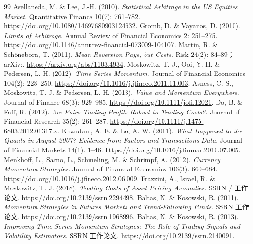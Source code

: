 \begin{thebibliography}{99}
 Avellaneda, M. \& Lee, J.-H. (2010). \emph{Statistical Arbitrage in the US Equities Market}. Quantitative Finance 10(7): 761--782. \href{https://doi.org/10.1080/14697680903124632}{https://doi.org/10.1080/14697680903124632}.
 Gromb, D. \& Vayanos, D. (2010). \emph{Limits of Arbitrage}. Annual Review of Financial Economics 2: 251--275. \href{https://doi.org/10.1146/annurev-financial-073009-104107}{https://doi.org/10.1146/annurev-financial-073009-104107}.
 Martin, R. \& Schöneborn, T. (2011). \emph{Mean Reversion Pays, but Costs}. Risk 24(2): 84--89；arXiv:. \href{https://arxiv.org/abs/1103.4934}{https://arxiv.org/abs/1103.4934}.
 Moskowitz, T. J., Ooi, Y. H. \& Pedersen, L. H. (2012). \emph{Time Series Momentum}. Journal of Financial Economics 104(2): 228--250. \href{https://doi.org/10.1016/j.jfineco.2011.11.003}{https://doi.org/10.1016/j.jfineco.2011.11.003}.
 Asness, C. S., Moskowitz, T. J. \& Pedersen, L. H. (2013). \emph{Value and Momentum Everywhere}. Journal of Finance 68(3): 929--985. \href{https://doi.org/10.1111/jofi.12021}{https://doi.org/10.1111/jofi.12021}.
 Do, B. \& Faff, R. (2012). \emph{Are Pairs Trading Profits Robust to Trading Costs?}. Journal of Financial Research 35(2): 261--287. \href{https://doi.org/10.1111/j.1475-6803.2012.01317.x}{https://doi.org/10.1111/j.1475-6803.2012.01317.x}.
 Khandani, A. E. \& Lo, A. W. (2011). \emph{What Happened to the Quants in August 2007? Evidence from Factors and Transactions Data}. Journal of Financial Markets 14(1): 1--46. \href{https://doi.org/10.1016/j.finmar.2010.07.005}{https://doi.org/10.1016/j.finmar.2010.07.005}.
 Menkhoff, L., Sarno, L., Schmeling, M. \& Schrimpf, A. (2012). \emph{Currency Momentum Strategies}. Journal of Financial Economics 106(3): 660--684. \href{https://doi.org/10.1016/j.jfineco.2012.06.009}{https://doi.org/10.1016/j.jfineco.2012.06.009}.
 Frazzini, A., Israel, R. \& Moskowitz, T. J. (2018). \emph{Trading Costs of Asset Pricing Anomalies}. SSRN / 工作论文. \href{https://doi.org/10.2139/ssrn.2294498}{https://doi.org/10.2139/ssrn.2294498}.
 Baltas, N. \& Kosowski, R. (2011). \emph{Momentum Strategies in Futures Markets and Trend-Following Funds}. SSRN 工作论文. \href{https://doi.org/10.2139/ssrn.1968996}{https://doi.org/10.2139/ssrn.1968996}.
 Baltas, N. \& Kosowski, R. (2013). \emph{Improving Time-Series Momentum Strategies: The Role of Trading Signals and Volatility Estimators}. SSRN 工作论文. \href{https://doi.org/10.2139/ssrn.2140091}{https://doi.org/10.2139/ssrn.2140091}.

\end{thebibliography}
